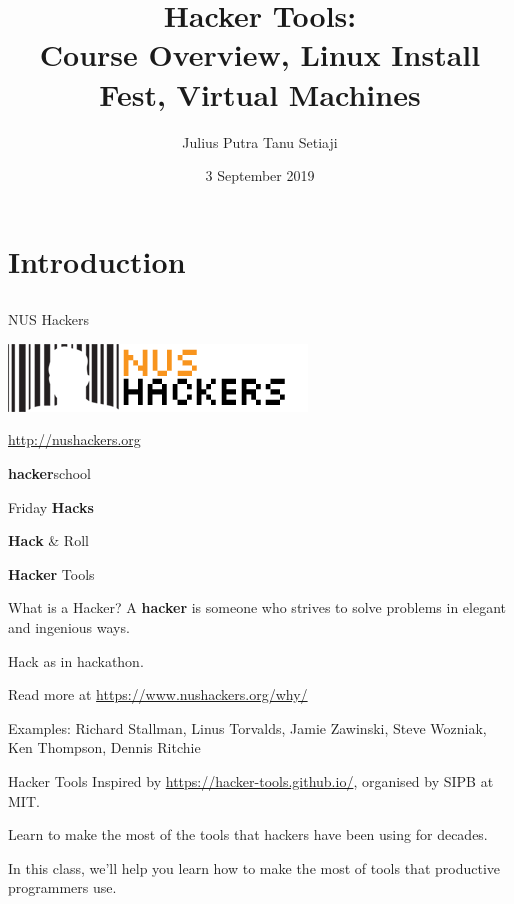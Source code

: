 \documentclass[11pt]{beamer}
\title{Hacker Tools: \\Course Overview, Linux Install Fest, Virtual Machines}
\author{Julius Putra Tanu Setiaji}
\date{3 September 2019}
\begin{document}
\frame[plain]{\titlepage}

\section{Introduction}
\subsection{}

\begin{frame}{NUS Hackers}

  \begin{center}
    \includegraphics[width=0.5\linewidth]{../NUSHackers}

    \url{http://nushackers.org}
  \end{center}

  \begin{center}
    \textbf{hacker}school

    Friday \textbf{Hacks}

    \textbf{Hack} \& Roll

    \textbf{Hacker} Tools
  \end{center}

\end{frame}

\begin{frame}{What is a Hacker?}
  A \textbf{hacker} is someone who strives to solve problems in elegant and ingenious ways.

  Hack as in hackathon.

  Read more at \url{https://www.nushackers.org/why/}

  Examples: Richard Stallman, Linus Torvalds, Jamie Zawinski, Steve Wozniak, Ken Thompson, Dennis Ritchie
\end{frame}

\begin{frame}{Hacker Tools}
  Inspired by \url{https://hacker-tools.github.io/}, organised by SIPB at MIT.

  Learn to make the most of the tools that hackers have been using for decades.

  In this class, we'll help you learn how to make the most of tools that productive programmers use.
\end{frame}
\end{document}
